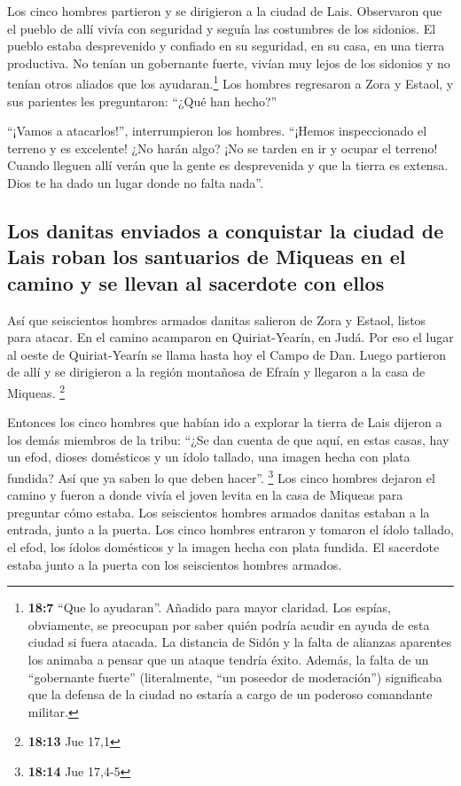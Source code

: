  Los cinco hombres partieron y se dirigieron a la ciudad
de Lais. Observaron que el pueblo de allí vivía con seguridad y seguía
las costumbres de los sidonios. El pueblo estaba desprevenido y confiado
en su seguridad, en su casa, en una tierra productiva. No tenían un
gobernante fuerte, vivían muy lejos de los sidonios y no tenían otros
aliados que los ayudaran.\footnote{\textbf{18:7} ``Que lo ayudaran''.
  Añadido para mayor claridad. Los espías, obviamente, se preocupan por
  saber quién podría acudir en ayuda de esta ciudad si fuera atacada. La
  distancia de Sidón y la falta de alianzas aparentes los animaba a
  pensar que un ataque tendría éxito. Además, la falta de un
  ``gobernante fuerte'' (literalmente, ``un poseedor de moderación'')
  significaba que la defensa de la ciudad no estaría a cargo de un
  poderoso comandante militar.}  Los hombres regresaron a
Zora y Estaol, y sus parientes les preguntaron: ``¿Qué han hecho?''

 ``¡Vamos a atacarlos!'', interrumpieron los hombres.
``¡Hemos inspeccionado el terreno y es excelente! ¿No harán algo? ¡No se
tarden en ir y ocupar el terreno!  Cuando lleguen allí
verán que la gente es desprevenida y que la tierra es extensa. Dios te
ha dado un lugar donde no falta nada''.

\hypertarget{los-danitas-enviados-a-conquistar-la-ciudad-de-lais-roban-los-santuarios-de-miqueas-en-el-camino-y-se-llevan-al-sacerdote-con-ellos}{%
\subsection{Los danitas enviados a conquistar la ciudad de Lais roban
los santuarios de Miqueas en el camino y se llevan al sacerdote con
ellos}\label{los-danitas-enviados-a-conquistar-la-ciudad-de-lais-roban-los-santuarios-de-miqueas-en-el-camino-y-se-llevan-al-sacerdote-con-ellos}}

 Así que seiscientos hombres armados danitas salieron de
Zora y Estaol, listos para atacar.  En el camino
acamparon en Quiriat-Yearín, en Judá. Por eso el lugar al oeste de
Quiriat-Yearín se llama hasta hoy el Campo de Dan.  Luego
partieron de allí y se dirigieron a la región montañosa de Efraín y
llegaron a la casa de Miqueas. \footnote{\textbf{18:13} Jue 17,1}

 Entonces los cinco hombres que habían ido a explorar la
tierra de Lais dijeron a los demás miembros de la tribu: ``¿Se dan
cuenta de que aquí, en estas casas, hay un efod, dioses domésticos y un
ídolo tallado, una imagen hecha con plata fundida? Así que ya saben lo
que deben hacer''. \footnote{\textbf{18:14} Jue 17,4-5} 
Los cinco hombres dejaron el camino y fueron a donde vivía el joven
levita en la casa de Miqueas para preguntar cómo estaba. 
Los seiscientos hombres armados danitas estaban a la entrada, junto a la
puerta.  Los cinco hombres entraron y tomaron el ídolo
tallado, el efod, los ídolos domésticos y la imagen hecha con plata
fundida. El sacerdote estaba junto a la puerta con los seiscientos
hombres armados.


